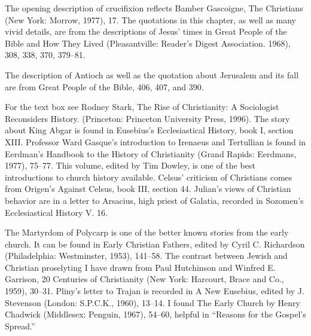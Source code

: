 
\begin{notelist}
\entry The opening description of crucifixion reflects Bamber Gascoigne, The Christians (New York:
  Morrow, 1977), 17.
\entry The quotations in this chapter, as well as many vivid details, are from the descriptions of
  Jesus’ times in Great People of the Bible and How They Lived (Pleasantville: Reader’s Digest
  Association. 1968), 308, 338, 370, 379–81.
\end{notelist}

\begin{notelist}
\entry The description of Antioch as well as the quotation about Jerusalem and its fall are from
  Great People of the Bible, 406, 407, and 390.
\end{notelist}

\begin{notelist}
\entry For the text box see Rodney Stark, The Rise of Christianity: A Sociologist Reconsiders
  History. (Princeton: Princeton University Press, 1996).
\entry The story about King Abgar is found in Eusebius’s Ecclesiastical History, book I, section
  XIII.
\entry Professor Ward Gasque’s introduction to Irenaeus and Tertullian is found in Eerdman’s
  Handbook to the History of Christianity (Grand Rapids: Eerdmans, 1977), 75–77. This volume, edited
  by Tim Dowley, is one of the best introductions to church history available.
\entry Celsus’ criticism of Christians comes from Origen’s Against Celsus, book III, section 44.
\entry Julian’s views of Christian behavior are in a letter to Arsacius, high priest of Galatia,
  recorded in Sozomen’s Ecclesiastical History V. 16.
\end{notelist}

\begin{notelist}
\entry The Martyrdom of Polycarp is one of the better known stories from the early church. It can be
  found in Early Christian Fathers, edited by Cyril C. Richardson (Philadelphia: Westminster, 1953),
  141–58.
\entry The contrast between Jewish and Christian proselyting I have drawn from Paul Hutchinson and
  Winfred E. Garrison, 20 Centuries of Christianity (New York: Harcourt, Brace and Co., 1959),
  30–31.
\entry Pliny’s letter to Trajan is recorded in A New Eusebius, edited by J. Stevenson (London:
  S.P.C.K., 1960), 13–14.
\entry I found The Early Church by Henry Chadwick (Middlesex: Penguin, 1967), 54–60, helpful in
  “Reasons for the Gospel’s Spread.”
\end{notelist}

